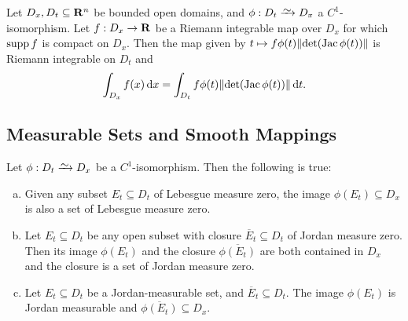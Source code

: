 \begin{theorem}
\label{thm:change-variables}
Let \(D_x, D_t \subseteq \mathbf{R}^n\) be bounded open domains, and \(\phi: D_t \isoto
D_x\) a \(C^1\)-isomorphism. Let \(f: D_x \to \mathbf{R}\) be a Riemann integrable map
over \(D_x\) for which \(\operatorname{supp} f\) is compact on \(D_x\). Then the map given by
\(t \mapsto f \phi(t) \lVert\det(\operatorname{Jac} \phi(t))\rVert\) is Riemann integrable on
\(D_t\) and
\[
  \int_{D_x} f(x)\, \mathrm{d} x
  = \int_{D_t} f \phi(t) \lVert\det(\operatorname{Jac} \phi(t))\rVert\, \mathrm{d} t.
\]
\end{theorem}

\subsection{Measurable Sets and Smooth Mappings}

\begin{lemma}
\label{lem:C1-isomorphisms-preserve-measure-properties}
Let \(\phi: D_t \isoto D_x\) be a \(C^1\)-isomorphism. Then the following is
true:
\begin{enumerate}[(a)]\setlength\itemsep{0em}
\item Given any subset \(E_t \subseteq D_t\) of Lebesgue measure zero, the image
  \(\phi(E_t) \subseteq D_x\) is also a set of Lebesgue measure zero.

\item Let \(E_t \subseteq D_t\) be any open subset with closure \(\overline{E}_t
  \subseteq D_t\) of Jordan measure zero. Then its image \(\phi(E_t)\) and the
  closure \(\overline{\phi(E_t)}\) are both contained in \(D_x\) and the closure
  is a set of Jordan measure zero.

\item Let \(E_t \subseteq D_t\) be a Jordan-measurable set, and \(\overline E_t
  \subseteq D_t\). The image \(\phi(E_t)\) is Jordan measurable and
  \(\overline{\phi(E_t)} \subseteq D_x\).
\end{enumerate}
\end{lemma}

